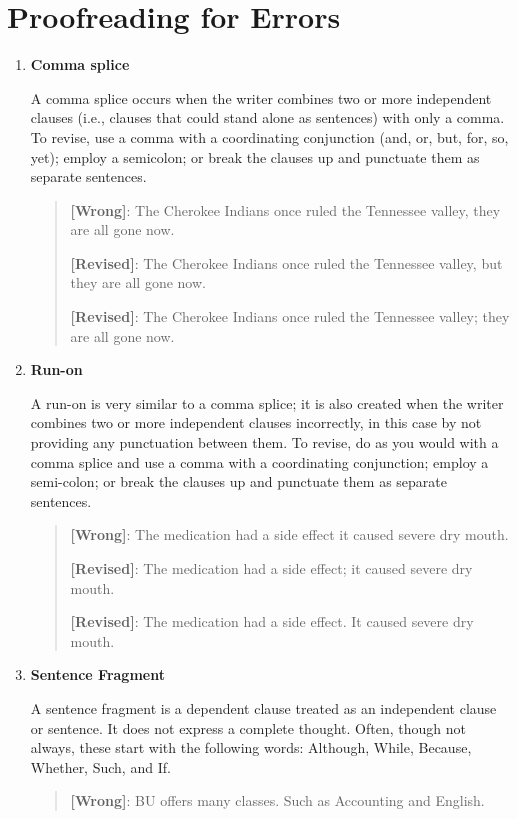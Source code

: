 
 
\chapter{Proofreading for Errors}

\begin{enumerate}

\item \textbf{Comma splice}

A comma splice occurs when the writer combines two or more independent clauses (i.e., clauses that could stand alone as sentences) with only a comma. To revise, use a comma with a coordinating conjunction (and, or, but, for, so, yet); employ a semicolon; or break the clauses up and punctuate them as separate sentences.
\begin{quote}
\textbf{[Wrong]}: The Cherokee Indians once ruled the Tennessee valley, they are all gone now.

\textbf{[Revised]}:  The Cherokee Indians once ruled the Tennessee valley, but they are all gone now.

\textbf{[Revised]}: The Cherokee Indians once ruled the Tennessee valley; they are all gone now.
\end{quote}
\item \textbf{Run-on}

A run-on is very similar to a comma splice; it is also created when the writer combines two or more independent clauses incorrectly, in this case by not providing any punctuation between them.  To revise, do as you would with a comma splice and use a comma with a coordinating conjunction; employ a semi-colon; or break the clauses up and punctuate them as separate sentences.
\begin{quote}
\textbf{[Wrong]}: The medication had a side effect it caused severe dry mouth.

\textbf{[Revised]}: The medication had a side effect; it caused severe dry mouth.

\textbf{[Revised]}: The medication had a side effect. It caused severe dry mouth.
\end{quote}
\item \textbf{Sentence Fragment}

A sentence fragment is a dependent clause treated as an independent clause or sentence. It does not express a complete thought. Often, though not always, these start with the following words: Although, While, Because, Whether, Such, and If.
\begin{quote}
\textbf{[Wrong]}: BU offers many classes. Such as Accounting and English.


\end{quote}
\end{enumerate}
